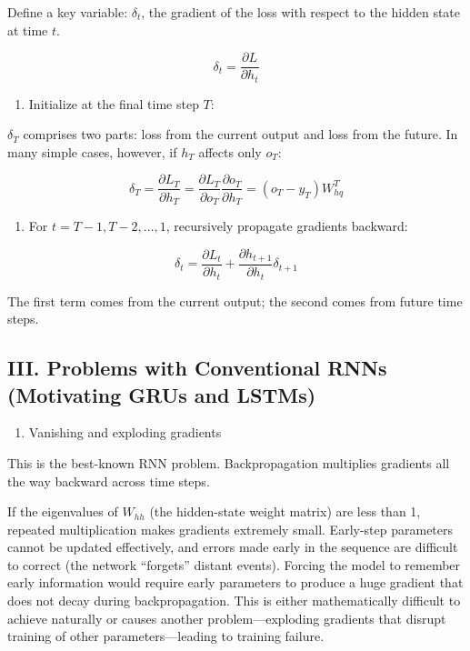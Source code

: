 Define a key variable: \(\delta_t\), the gradient of the loss with respect to the hidden state at time \(t\).

\[
\delta_t = \frac{\partial L}{\partial h_t}
\]

\begin{enumerate}
\def\labelenumi{\arabic{enumi}.}
\tightlist
\item
{}
  Initialize at the final time step \(T\):
\end{enumerate}

\(\delta_T\) comprises two parts: loss from the current output and loss from the future. In many simple cases, however, if \(h_T\) affects only \(o_T\):

\[
\delta_T = \frac{\partial L_T}{\partial h_T}
= \frac{\partial L_T}{\partial o_T}\frac{\partial o_T}{\partial h_T}
= (o_T - y_T) W_{hq}^T
\]

\begin{enumerate}
\def\labelenumi{\arabic{enumi}.}
\setcounter{enumi}{1}
\tightlist
\item
{}
  For \(t = T-1, T-2, \ldots, 1\), recursively propagate gradients backward:
\end{enumerate}

\[
\delta_t = \frac{\partial L_t}{\partial h_t} + \frac{\partial h_{t+1}}{\partial h_t}\delta_{t+1}
\]

The first term comes from the current output; the second comes from future time steps.

\hypertarget{iii.-problems-with-conventional-rnns-motivating-grus-and-lstms}{%
\subsection{III. Problems with Conventional RNNs (Motivating GRUs and LSTMs)}\label{iii.-problems-with-conventional-rnns-motivating-grus-and-lstms}}

\begin{enumerate}
\def\labelenumi{\arabic{enumi}.}
\tightlist
\item
  Vanishing and exploding gradients
\end{enumerate}

This is the best-known RNN problem. Backpropagation multiplies gradients all the way backward across time steps.

If the eigenvalues of \(W_{hh}\) (the hidden-state weight matrix) are less than 1, repeated multiplication makes gradients extremely small. Early-step parameters cannot be updated effectively, and errors made early in the sequence are difficult to correct (the network ``forgets'' distant events). Forcing the model to remember early information would require early parameters to produce a huge gradient that does not decay during backpropagation. This is either mathematically difficult to achieve naturally or causes another problem---exploding gradients that disrupt training of other parameters---leading to training failure.

